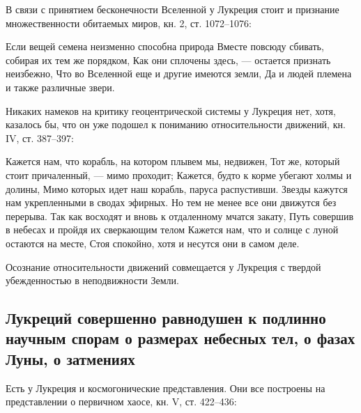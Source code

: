 В  связи  с  принятием  бесконечности Вселенной  у  Лукреция  стоит  и
признание множественности обитаемых миров, кн. 2, ст. 1072--1076:

Если вещей  семена неизменно способна природа  Вместе повсюду сбивать,
собирая  их тем  же порядком,  Как  они сплочены  здесь, ---  остается
признать неизбежно, Что во Вселенной еще  и другие имеются земли, Да и
людей племена и также различные звери.

Никаких  намеков на  критику геоцентрической  системы у  Лукреция нет,
хотя,  казалось бы,  что он  уже подошел  к пониманию  относительности
движений, кн. IV, ст. 387--397:

Кажется  нам, что  корабль, на  котором плывем  мы, недвижен,  Тот же,
который стоит причаленный,  --- мимо проходит; Кажется,  будто к корме
убегают  холмы  и  долины,  Мимо  которых  идет  наш  корабль,  паруса
распустивши. Звезды кажутся нам укрепленными  в сводах эфирных. Но тем
не менее  все они движутся  без перерыва. Так  как восходят и  вновь к
отдаленному  мчатся  закату,  Путь  совершив в  небесах  и  пройдя  их
сверкающим телом Кажется нам, что и  солнце с луной остаются на месте,
Стоя спокойно, хотя и несутся они в самом деле.

Осознание относительности  движений совмещается  у Лукреция  с твердой
убежденностью в неподвижности Земли.

\subsection{Лукреций совершенно равнодушен к подлинно научным спорам о
размерах небесных тел, о фазах Луны, о затмениях}

Есть у Лукреция и космогонические  представления. Они все построены на
представлении о первичном хаосе, кн. V, ст. 422--436:

